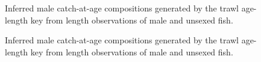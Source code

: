 \documentclass[11pt]{book}
\begin{document}
\newpage
\begin{figure}[htb]

{\centering {} 

}

\caption{Inferred male catch-at-age compositions generated by the trawl age-length key from length observations of male and unsexed fish.}\label{fig:unnamed-chunk-34}
\end{figure}
\newpage
\begin{figure}[htb]

{\centering {} 

}

\caption{Inferred male catch-at-age compositions generated by the trawl age-length key from length observations of male and unsexed fish.}\label{fig:unnamed-chunk-35}
\end{figure}
\end{document}
